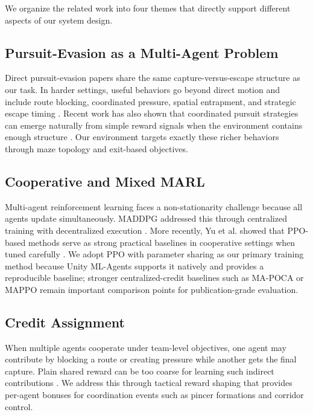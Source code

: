 \documentclass[conference]{IEEEtran}
\begin{document}
We organize the related work into four themes that directly support different aspects of our system design.

\subsection{Pursuit-Evasion as a Multi-Agent Problem}

Direct pursuit-evasion papers share the same capture-versus-escape structure as our task. In harder settings, useful behaviors go beyond direct motion and include route blocking, coordinated pressure, spatial entrapment, and strategic escape timing \cite{verma2019mapel,viper2025,gonultas2024,yan2019uncertain,liu2024uav}. Recent work has also shown that coordinated pursuit strategies can emerge naturally from simple reward signals when the environment contains enough structure \cite{haeri2022emergent}. Our environment targets exactly these richer behaviors through maze topology and exit-based objectives.

\subsection{Cooperative and Mixed MARL}

Multi-agent reinforcement learning faces a non-stationarity challenge because all agents update simultaneously. MADDPG addressed this through centralized training with decentralized execution \cite{lowe2017maddpg}. More recently, Yu et al. showed that PPO-based methods serve as strong practical baselines in cooperative settings when tuned carefully \cite{yu2022mappo}. We adopt PPO with parameter sharing as our primary training method because Unity ML-Agents supports it natively and provides a reproducible baseline; stronger centralized-credit baselines such as MA-POCA or MAPPO remain important comparison points for publication-grade evaluation.

\subsection{Credit Assignment}

When multiple agents cooperate under team-level objectives, one agent may contribute by blocking a route or creating pressure while another gets the final capture. Plain shared reward can be too coarse for learning such indirect contributions \cite{rashid2018qmix,foerster2018coma,wang2020implicit,chen2023explicit}. We address this through tactical reward shaping that provides per-agent bonuses for coordination events such as pincer formations and corridor control.
\end{document}
